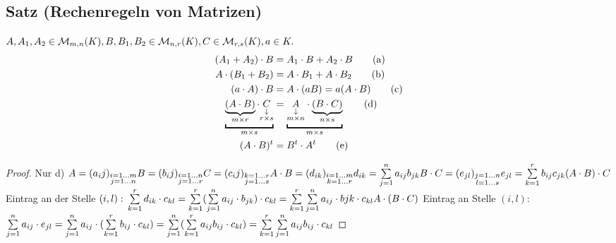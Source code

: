 \subsection{Satz (Rechenregeln von Matrizen)}
$A,A_1,A_2 \in \mathcal{M}_{m,n}(K),\\
B,B_1,B_2 \in \mathcal{M}_{n,r}(K),\\
C \in \mathcal{M}_{r,s}(K), a \in K.$
\begin{align}
(A_1 + A_2) \cd B &= A_1 \cd B + A_2 \cd B \tag{a}\\
A \cd (B_1 + B_2) &= A \cd B_1 + A \cd B_2 \tag{b}\\
(a \cd A) \cd B &= A \cd (aB) = a(A \cd B) \tag{c}\\
\underbracket{\underbrace{(A \cd B)}_{m \times r} \cd \underset{\substack{\downarrow\\r\times s}}{C}}_{m \times s} &= \underbracket{\underset{\substack{\downarrow\\m \times n}}{A} \cd \underbrace{(B \cd C)}_{n \times s}}_{m \times s} \tag{d}\\
(A \cd B)^t &= B^t \cd A^t \tag{e}
\end{align}
\begin{proof}
Nur d)
$A = (a_ij)_{\substack{i=1\ldots m\\j = 1\ldots n}}\\
B = (b_ij)_{\substack{i=1\ldots n\\j = 1\ldots r}}\\
C = (c_ij)_{\substack{k=1\ldots r\\j = 1\ldots s}}\\
A \cdot B = (d_{ik})_{\substack{i=1\ldots m\\k = 1\ldots r}}\\
d_{ik} = \sum\limits_{j=1}^{n} a_{ij}b_{jk}\\
B \cdot C = (e_{jl})_{\substack{j=1\ldots n\\l = 1\ldots s}}\\
e_{jl} = \sum\limits_{k=1}^{r} b_{ij}c_{jk}\\
(A\cdot B)\cdot C\\$
Eintrag an der Stelle $(i,l):\\
\sum\limits_{k=1}^{r} d_{ik} \cdot c_{kl} = \sum\limits_{k=1}^{r} (\sum\limits_{j=1}^{n} a_{ij} \cdot b_{jk}) \cdot c_{kl} = \sum\limits_{k=1}^{r} \sum\limits_{j=1}^{n} a_{ij} \cdot b{jk} \cdot c_{kl}\\
A \cdot (B \cdot C)$ Eintrag an Stelle $(i,l)$:\\
$\sum\limits_{j=1}^{n} a_{ij} \cdot e_{jl} = \sum\limits_{j=1}^{n} a_{ij} \cdot (\sum\limits_{k=1}^{r} b_{ij} \cdot c_{kl}) =  \sum\limits_{j=1}^{n} (\sum\limits_{k=1}^{r} a_{ij} b_{ij} \cdot c_{kl}) = \sum\limits_{k=1}^{r} \sum\limits_{j=1}^{n} a_{ij} b_{ij} \cdot c_{kl}$
\end{proof}

